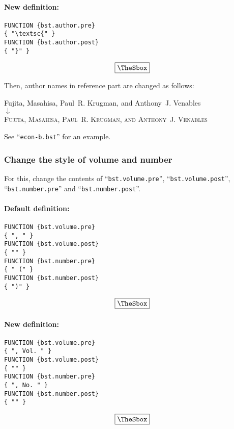 \documentclass[10pt]{article}
\newenvironment{Frame}%
{\setlength{\fboxsep}{15pt}
\setlength{\mylength}{\linewidth}%
\addtolength{\mylength}{-2\fboxsep}%
\addtolength{\mylength}{-2\fboxrule}%
\Sbox
\minipage{\mylength}%
\setlength{\abovedisplayskip}{0pt}%
\setlength{\belowdisplayskip}{0pt}%
}%
{\endminipage\endSbox
\[\fbox{\TheSbox}\]}
\begin{document}
\paragraph{New definition:}
\begin{Frame}
\begin{verbatim}
FUNCTION {bst.author.pre}
{ "\textsc{" }
FUNCTION {bst.author.post}
{ "}" }
\end{verbatim}
\end{Frame}

Then, author names in reference part are changed as follows:
\begin{center}
Fujita, Masahisa, Paul~R. Krugman, and Anthony~J. Venables \\
 $\downarrow$ \\
\textsc{Fujita, Masahisa, Paul~R. Krugman, and Anthony~J. Venables}
\end{center}

See ``\texttt{econ-b.bst}'' for an example.

\subsubsection{Change the style of volume and number}

For this, change the contents of ``\texttt{bst.volume.pre}'',
``\texttt{bst.volume.post}'', ``\texttt{bst.number.pre}'' and
``\texttt{bst.number.post}''.  

\paragraph{Default definition:}
\begin{Frame}
\begin{verbatim}
FUNCTION {bst.volume.pre}
{ ", " }
FUNCTION {bst.volume.post}
{ "" }
FUNCTION {bst.number.pre}
{ " (" }
FUNCTION {bst.number.post}
{ ")" }
\end{verbatim}
\end{Frame}

\paragraph{New definition:}
\begin{Frame}
 \begin{verbatim}
FUNCTION {bst.volume.pre}
{ ", Vol. " }
FUNCTION {bst.volume.post}
{ "" }
FUNCTION {bst.number.pre}
{ ", No. " }
FUNCTION {bst.number.post}
{ "" }
\end{verbatim}
\end{Frame}
\end{document}
